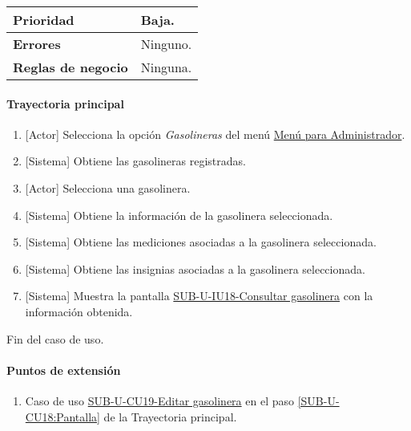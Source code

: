 \begin{longtable}{|J{5cm}|J{10.3cm}|}
	\textbf{Prioridad} & 
		Baja. \\ \hline
	\textbf{Errores} & Ninguno.
		\\ \hline
	\textbf{Reglas de negocio} & Ninguna.
		 \\ \hline
\end{longtable}

\paragraph{Trayectoria principal}
	\begin{enumerate}
		\item {[Actor]} Selecciona la opción \textit{Gasolineras} del menú \hyperref[fig:menu-admi]{Menú para Administrador}.
		\item {[Sistema]} Obtiene las gasolineras registradas.
		\item {[Actor]} Selecciona una gasolinera.
		\item {[Sistema]} Obtiene la información de la gasolinera seleccionada.
		\item {[Sistema]} Obtiene las mediciones asociadas a la gasolinera seleccionada.
		\item {[Sistema]} Obtiene las insignias asociadas a la gasolinera seleccionada.
		\item \label{SUB-U-CU18:Pantalla} {[Sistema]} Muestra la pantalla \hyperref[fig:sub-u-iu18]{SUB-U-IU18-Consultar gasolinera} con la información obtenida.
	\end{enumerate}
	Fin del caso de uso.

\paragraph{Puntos de extensión} \label{SUB-U-CU18:P1}
\begin{enumerate}[label=PE\arabic*.]
	\item Caso de uso \hyperref[SUB-U-CU19]{SUB-U-CU19-Editar gasolinera} en el paso \ref{SUB-U-CU18:Pantalla} de la Trayectoria principal.
\end{enumerate}

